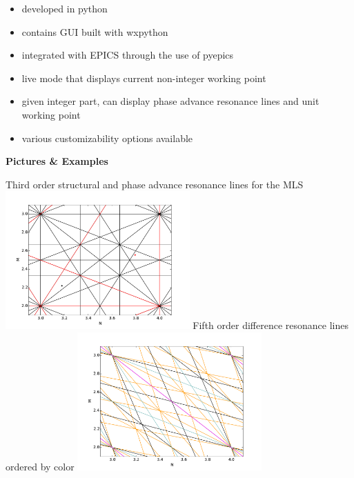 \documentclass[
logosetup=topbar 
portrait,
a0paper%
]
{baposter}
\begin{document}
\begin{poster}
{\begin{itemize}
\item[\color{hzbblue}\textbullet] developed in python
\item[\color{hzbblue}\textbullet] contains GUI built with wxpython
\item[\color{hzbblue}\textbullet] integrated with EPICS through the use of pyepics
\item[\color{hzbblue}\textbullet] live mode that displays current non-integer working point
\item[\color{hzbblue}\textbullet] given integer part, can display phase advance resonance lines and unit working point
\item[\color{hzbblue}\textbullet] various customizability options available

\end{itemize}
{\color{hzbblue}\bf\large Pictures \& Examples}
\begin{center}
\large Third order structural and phase advance resonance lines for the MLS
\includegraphics[width=200pt]{Pics/image.pdf}
\large Fifth order difference resonance lines ordered by color
\includegraphics[width=200pt]{Pics/image2.pdf}
\end{center}

}
\end{poster}
\end{document}

